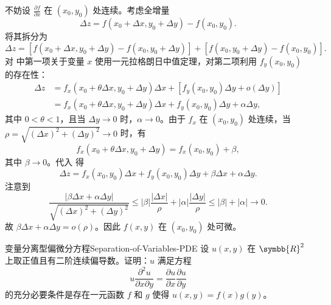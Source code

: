 \begin{myproof}
    不妨设 $\frac{\partial f}{\partial x}$ 在 $(x_0, y_0)$ 处连续。考虑全增量
    \begin{equation}
        \Delta z = f(x_0 + \Delta x, y_0 + \Delta y) - f(x_0, y_0).
        \label{eq:diff-def-1}
    \end{equation}
    将其拆分为
    \begin{equation}
        \Delta z = [f(x_0 + \Delta x, y_0 + \Delta y) - f(x_0, y_0 + \Delta y)] + [f(x_0, y_0 + \Delta y) - f(x_0, y_0)].
        \label{eq:increment-split}
    \end{equation}
    对  中第一项关于变量 $x$ 使用一元拉格朗日中值定理，对第二项利用 $f_y(x_0, y_0)$ 的存在性：
    \begin{equation}
        \begin{aligned}
            \Delta z & = f_x(x_0 + \theta \Delta x, y_0 + \Delta y) \Delta x + [f_y(x_0, y_0) \Delta y + o(\Delta y)]    \\
                     & = f_x(x_0 + \theta \Delta x, y_0 + \Delta y) \Delta x + f_y(x_0, y_0) \Delta y + \alpha \Delta y,
        \end{aligned}
        \label{eq:mvt-apply}
    \end{equation}
    其中 $0 < \theta < 1$，且当 $\Delta y \to 0$ 时，$\alpha \to 0$。由于 $f_x$ 在 $(x_0, y_0)$ 处连续，当 $\rho = \sqrt{(\Delta x)^2 + (\Delta y)^2} \to 0$ 时，有
    \begin{equation}
        f_x(x_0 + \theta \Delta x, y_0 + \Delta y) = f_x(x_0, y_0) + \beta,
        \label{eq:fx-cont}
    \end{equation}
    其中 $\beta \to 0$。代入  得
    \begin{equation}
        \Delta z = f_x(x_0, y_0) \Delta x + f_y(x_0, y_0) \Delta y + \beta \Delta x + \alpha \Delta y.
        \label{eq:final-form}
    \end{equation}
    注意到
    \begin{equation}
        \frac{|\beta \Delta x + \alpha \Delta y|}{\sqrt{(\Delta x)^2 + (\Delta y)^2}} \leqslant |\beta| \frac{|\Delta x|}{\rho} + |\alpha| \frac{|\Delta y|}{\rho} \leqslant |\beta| + |\alpha| \to 0.
        \label{eq:limit-zero}
    \end{equation}
    故 $\beta \Delta x + \alpha \Delta y = o(\rho)$。因此 $f(x, y)$ 在 $(x_0, y_0)$ 处可微。
\end{myproof}

\begin{problem}{变量分离型偏微分方程}{Separation-of-Variables-PDE}
    设 $u(x, y)$ 在 $\symbb{R}^2$ 上取正值且有二阶连续偏导数。证明：$u$ 满足方程
    \begin{equation}
        u \frac{\partial^2 u}{\partial x \partial y} = \frac{\partial u}{\partial x} \frac{\partial u}{\partial y}
        \label{eq:pde-origin}
    \end{equation}
    的充分必要条件是存在一元函数 $f$ 和 $g$ 使得 $u(x, y) = f(x)g(y)$。
\end{problem}


